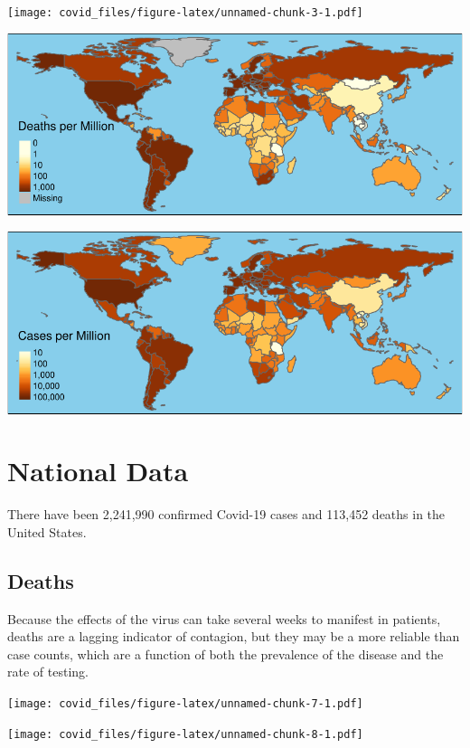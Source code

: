 \documentclass[]{article}
\begin{document}
\newpage

\texttt{[image: covid\_files/figure-latex/unnamed-chunk-3-1.pdf]}

\includegraphics{covid_files/figure-latex/unnamed-chunk-4-1.pdf}

\includegraphics{covid_files/figure-latex/unnamed-chunk-5-1.pdf}

\newpage

\hypertarget{national-data}{%
\section{National Data}\label{national-data}}

There have been 2,241,990 confirmed Covid-19 cases and 113,452 deaths in
the United States.

\hypertarget{deaths}{%
\subsection{Deaths}\label{deaths}}

Because the effects of the virus can take several weeks to manifest in
patients, deaths are a lagging indicator of contagion, but they may be a
more reliable than case counts, which are a function of both the
prevalence of the disease and the rate of testing.

\texttt{[image: covid\_files/figure-latex/unnamed-chunk-7-1.pdf]}

\texttt{[image: covid\_files/figure-latex/unnamed-chunk-8-1.pdf]}
\end{document}
